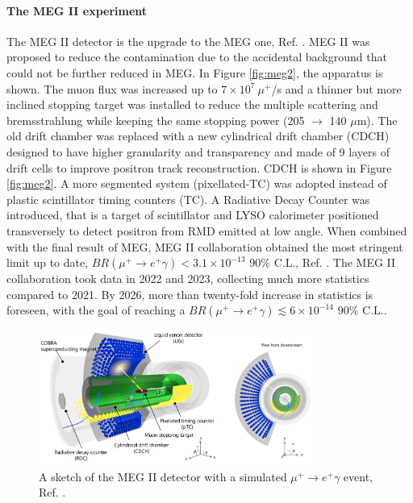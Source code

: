 \paragraph{The MEG II experiment}
The MEG II detector is the upgrade to the MEG one, Ref. \cite{megiicollaboration2024operation}.
MEG II was proposed to reduce the contamination due to the accidental background that could not be further reduced in MEG.
In Figure \ref{fig:meg2}, the apparatus is shown. The muon flux was increased up to $7 \times 10^7 \ \mu^+$/s and a thinner but more inclined 
stopping target was installed to reduce the multiple scattering and bremsstrahlung 
while keeping the same stopping power (205 $\rightarrow$ 140 $\mu$m).
The old drift chamber was replaced with a new cylindrical drift chamber (CDCH) designed
to have higher granularity and transparency and made of 9 layers of drift cells to
improve positron track reconstruction. CDCH is shown in Figure \ref{fig:meg2}.
A more segmented system (pixellated-TC) was adopted instead of plastic scintillator timing counters (TC).
A Radiative Decay Counter was introduced, that is a target of scintillator and LYSO calorimeter positioned transversely to detect positron from RMD emitted at low angle.
When combined with the final result of MEG, MEG II collaboration obtained the most stringent limit up to date, $BR(\mu^+ \rightarrow e^+ \gamma)<3.1\times 10^{-13}$ 90\% C.L., Ref. \cite{megiicollaboration2024search}.
The MEG II collaboration took data in 2022 and 2023, collecting much more statistics compared to 2021. By 2026, more than twenty-fold increase in statistics is foreseen, with the goal of reaching a
$BR(\mu^+ \rightarrow e^+ \gamma)\lesssim 6\times 10^{-14}$ 90\% C.L..
\begin{figure}[!h]
    \centering
    \includegraphics[width =0.8\textwidth]{figures/png/Screenshot_20240307_140116.png}
    \caption{A sketch of the MEG II detector with a simulated $\mu^+ \rightarrow e^+ \gamma $ event, Ref. \cite{megiicollaboration2024operation}.}
    \label{fig:meg22}
    \end{figure}

